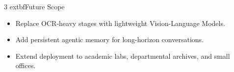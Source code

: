 \documentclass[10pt,a4paper]{article}
\begin{document}
\begin{multicols}{3}
	extbf{Future Scope}
\begin{itemize}
    \item Replace OCR-heavy stages with lightweight Vision-Language Models.
    \item Add persistent agentic memory for long-horizon conversations.
    \item Extend deployment to academic labs, departmental archives, and small offices.
\end{itemize}

\end{multicols}
\end{document}
